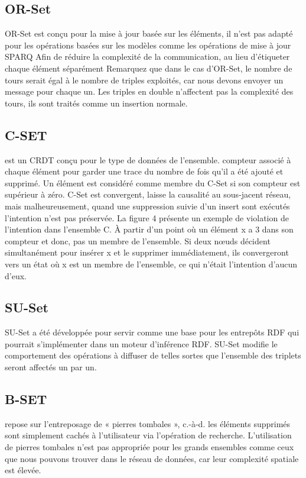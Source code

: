 \documentclass[12pt]{report}
\begin{document}
\subsection{OR-Set}
OR-Set est conçu pour la mise à jour basée sur les éléments, il n’est pas adapté pour les opérations basées sur les modèles comme les opérations de mise à jour SPARQ  Afin de réduire la complexité de la communication, au lieu d’étiqueter chaque élément séparément Remarquez que dans le cas d’OR-Set, le nombre de tours serait égal à le nombre de triples exploités, car nous devons envoyer un message pour chaque un. Les triples en double n’affectent pas la complexité des tours, ils sont traités comme un insertion normale.
\subsection{C-SET \cite{C-SET}}
est un CRDT conçu pour le type de données de l’ensemble.
compteur associé à chaque élément pour garder une trace du nombre de fois qu’il a été ajouté et supprimé. Un élément est considéré comme membre du C-Set si son compteur
est supérieur à zéro. C-Set est convergent, laisse la causalité au sous-jacent réseau, mais malheureusement, quand une suppression suivie d’un insert sont exécutés
l’intention n’est pas préservée. La figure 4 présente un exemple de violation de l’intention dans l’ensemble C. À partir d’un point où un élément x a 3 dans son compteur et donc, pas un membre de l’ensemble. Si deux nœuds décident simultanément pour insérer x et le supprimer immédiatement, ils convergeront vers un état où x est un membre de l’ensemble, ce qui n’était l’intention d’aucun d’eux.
\subsection{SU-Set}
SU-Set a été développée pour servir comme une base pour les entrepôts RDF qui 
pourrait s’implémenter dans un moteur d’inférence RDF. SU-Set modifie le comportement des 
opérations à diffuser de telles sortes que l’ensemble des triplets seront affectés un par un.
\subsection{B-SET \cite{B-SET}} repose sur l’entreposage de « pierres tombales », c.-à-d. les éléments supprimés sont simplement cachés à l’utilisateur via l’opération de recherche. L’utilisation de pierres tombales n’est pas appropriée pour les grands ensembles comme ceux que nous pouvons trouver dans le réseau de données, car leur complexité spatiale est élevée.
\end{document}
